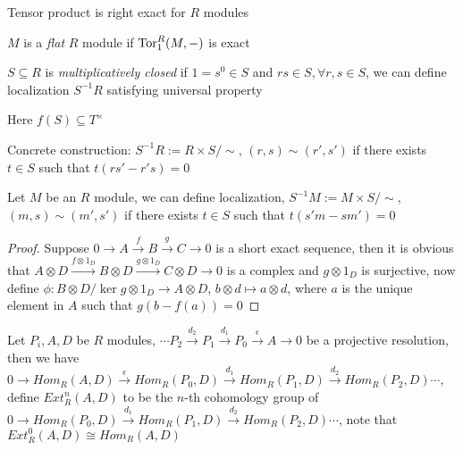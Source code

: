 \documentclass[main]{subfiles}
\begin{document}
\begin{theorem}
Tensor product is right exact for $R$ modules
\end{theorem}

\begin{definition}
$M$ is a \textit{flat} $R$ module if $\operatorname{Tor}^R_1(M,-)$ is exact
\end{definition}

\begin{definition}
$S\subseteq R$ is \textit{multiplicatively closed} if $1=s^0\in S$ and $rs\in S,\forall r,s\in S$, we can define localization $S^{-1}R$ satisfying universal property \par
\begin{center}
\end{center}
Here $f(S)\subseteq T^\times$ \par
Concrete construction: $S^{-1}R:=R\times S/\sim$, $(r,s)\sim (r',s')$ if there exists $t\in S$ such that $t(rs'-r's)=0$ \par
Let $M$ be an $R$ module, we can define localization, $S^{-1}M:=M\times S/\sim$, $(m,s)\sim (m',s')$ if there exists $t\in S$ such that $t(s'm-sm')=0$ \par
\end{definition}

\begin{proof}
Suppose $0\to A\xrightarrow{f} B\xrightarrow{g} C\to 0$ is a short exact sequence, then it is obvious that $A\otimes D\xrightarrow{f\otimes1_D}B\otimes D\xrightarrow{g\otimes1_D}C\otimes D\to0$ is a complex and $g\otimes1_D$ is surjective, now define $\phi:B\otimes D/\ker g\otimes1_D\to A\otimes D$, $b\otimes d\mapsto a\otimes d$, where $a$ is the unique element in $A$ such that $g(b-f(a))=0$
\end{proof}

\begin{definition}
Let $P_i,A,D$ be $R$ modules, $\cdots P_2\xrightarrow{d_2}P_1\xrightarrow{d_1}P_0\xrightarrow{\epsilon}A\to0$ be a projective resolution, then we have $0\to Hom_R(A,D)\xrightarrow{\epsilon}Hom_R(P_0,D)\xrightarrow{d_1}Hom_R(P_1,D)\xrightarrow{d_2}Hom_R(P_2,D)\cdots$, define $Ext_R^n(A,D)$ to be the $n$-th cohomology group of $0\to Hom_R(P_0,D)\xrightarrow{d_1}Hom_R(P_1,D)\xrightarrow{d_2}Hom_R(P_2,D)\cdots$, note that $Ext_R^0(A,D)\cong Hom_R(A,D)$
\end{definition}
\end{document}
